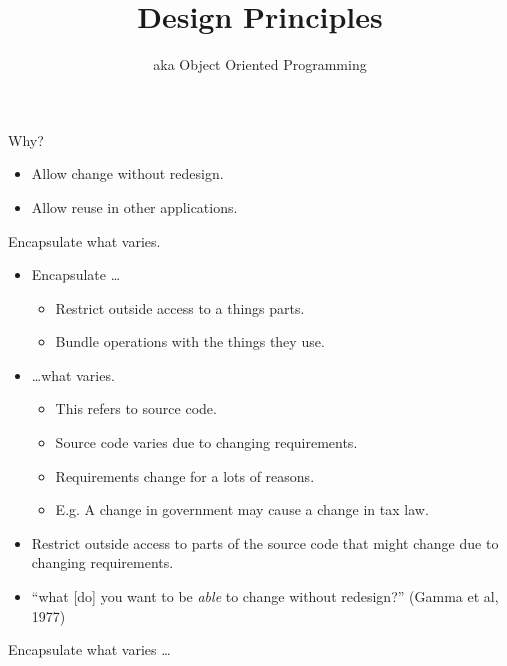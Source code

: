 \documentclass{beamer}
\title{Design Principles}
\subtitle{aka Object Oriented Programming}
\begin{document}
\begin{frame}
  \titlepage
\end{frame}

\begin{frame}{Why?}

    \begin{itemize}
        \item Allow change without redesign.
        \item Allow reuse in other applications.
    \end{itemize}

\end{frame}

\begin{frame}{Encapsulate what varies.}
    \begin{itemize}
        \item Encapsulate \ldots
            \begin{itemize}
                \item Restrict outside access to a things parts.
                \item Bundle operations with the things they use.
            \end{itemize}
        \item \ldots what varies.
            \begin{itemize}
                \item This refers to source code.
                \item Source code varies due to changing requirements.
                \item Requirements change for a lots of reasons.
                \item E.g. A change in government may cause a change in tax law.
            \end{itemize}
        \item Restrict outside access to parts of the source code that might change due to changing requirements.
        \item ``what [do] you want to be \textit{able} to change without redesign?'' (Gamma et al, 1977)
    \end{itemize}
\end{frame}

\begin{frame}{Encapsulate what varies \ldots}
    \begin{columns}
        \column{\dimexpr\paperwidth-40pt}
        
    \end{columns}
\end{frame}
\end{document}
